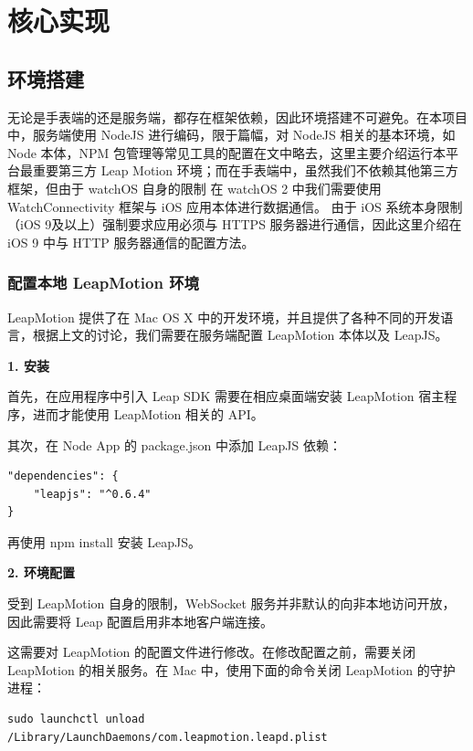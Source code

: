\chapter{核心实现}

\section{环境搭建}

无论是手表端的还是服务端，都存在框架依赖，因此环境搭建不可避免。在本项目中，服务端使用 NodeJS 进行编码，限于篇幅，对 NodeJS 相关的基本环境，如 Node 本体，NPM 包管理等常见工具的配置在文中略去，这里主要介绍运行本平台最重要第三方 Leap Motion 环境；而在手表端中，虽然我们不依赖其他第三方框架，但由于 watchOS 自身的限制\cite{WatchConnectivity:2016} 在 watchOS 2 中我们需要使用 WatchConnectivity 框架与 iOS 应用本体进行数据通信。
由于 iOS 系统本身限制（iOS 9及以上）强制要求应用必须与 HTTPS 服务器进行通信，因此这里介绍在 iOS 9 中与 HTTP 服务器通信的配置方法。

\subsection{配置本地 LeapMotion 环境}

LeapMotion 提供了在 Mac OS X 中的开发环境，并且提供了各种不同的开发语言，根据上文的讨论，我们需要在服务端配置 LeapMotion 本体以及 LeapJS。

\textbf{1. 安装}

首先，在应用程序中引入 Leap SDK 需要在相应桌面端安装 LeapMotion 宿主程序，进而才能使用 LeapMotion 相关的 API。

其次，在 Node App 的 package.json 中添加 LeapJS 依赖：
\begin{lstlisting}[frame=trBL,frameround=fttt,rulesepcolor=\color{white},numbers=none]
"dependencies": {
    "leapjs": "^0.6.4"
}
\end{lstlisting}
再使用 npm install 安装 LeapJS。

\textbf{2. 环境配置}

受到 LeapMotion 自身的限制\cite{Leap:2016}，WebSocket 服务并非默认的向非本地访问开放，因此需要将 Leap 配置启用非本地客户端连接。

这需要对 LeapMotion 的配置文件进行修改。在修改配置之前，需要关闭 LeapMotion 的相关服务。在 Mac 中，使用下面的命令关闭 LeapMotion 的守护进程：
\begin{lstlisting}[frame=trBL,frameround=fttt,rulesepcolor=\color{white},numbers=none]
sudo launchctl unload /Library/LaunchDaemons/com.leapmotion.leapd.plist
\end{lstlisting}

